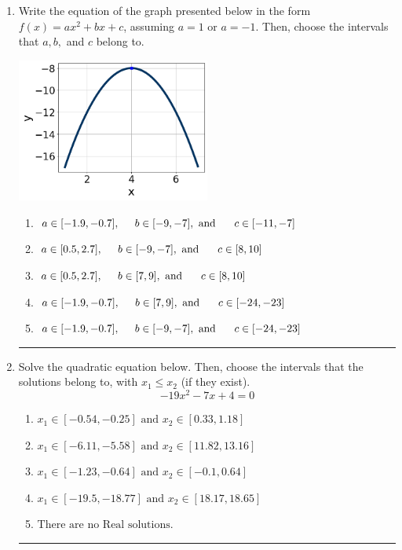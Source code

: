 \documentclass[14pt]{extbook}
\newcommand{\litem}[1]{\item#1\hspace*{-1cm}\rule{\textwidth}{0.4pt}}
\begin{document}
\begin{enumerate}
\litem{
Write the equation of the graph presented below in the form $f(x)=ax^2+bx+c$, assuming  $a=1$ or $a=-1$. Then, choose the intervals that $a, b,$ and $c$ belong to.
\begin{center}
    \includegraphics[width=0.5\textwidth]{../Figures/quadraticGraphToEquationB.png}
\end{center}
\begin{enumerate}[label=\Alph*.]
\item \( a \in [-1.9, -0.7], \hspace*{5mm} b \in [-9, -7], \text{ and } \hspace*{5mm} c \in [-11, -7] \)
\item \( a \in [0.5, 2.7], \hspace*{5mm} b \in [-9, -7], \text{ and } \hspace*{5mm} c \in [8, 10] \)
\item \( a \in [0.5, 2.7], \hspace*{5mm} b \in [7, 9], \text{ and } \hspace*{5mm} c \in [8, 10] \)
\item \( a \in [-1.9, -0.7], \hspace*{5mm} b \in [7, 9], \text{ and } \hspace*{5mm} c \in [-24, -23] \)
\item \( a \in [-1.9, -0.7], \hspace*{5mm} b \in [-9, -7], \text{ and } \hspace*{5mm} c \in [-24, -23] \)

\end{enumerate} }
\litem{
Solve the quadratic equation below. Then, choose the intervals that the solutions belong to, with $x_1 \leq x_2$ (if they exist).\[ -19x^{2} -7 x + 4 = 0 \]\begin{enumerate}[label=\Alph*.]
\item \( x_1 \in [-0.54, -0.25] \text{ and } x_2 \in [0.33, 1.18] \)
\item \( x_1 \in [-6.11, -5.58] \text{ and } x_2 \in [11.82, 13.16] \)
\item \( x_1 \in [-1.23, -0.64] \text{ and } x_2 \in [-0.1, 0.64] \)
\item \( x_1 \in [-19.5, -18.77] \text{ and } x_2 \in [18.17, 18.65] \)
\item \( \text{There are no Real solutions.} \)


\end{enumerate}}
\end{enumerate}
\end{document}
